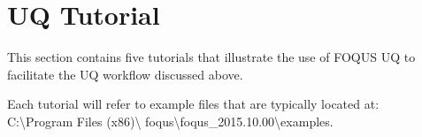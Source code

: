 \section{UQ Tutorial}
\label{sec:uq_tutorial}

This section contains five tutorials that illustrate the use of FOQUS UQ to
facilitate the UQ workflow discussed above.

Each tutorial will refer to example files that are typically located at:\\
C:\textbackslash Program Files (x86)\textbackslash
foqus\textbackslash foqus\_2015.10.00\textbackslash examples.  







